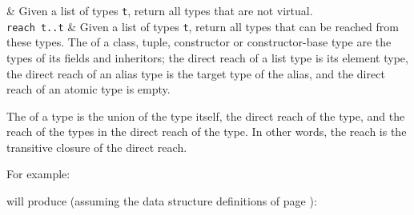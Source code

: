 \begin{desctab}
&
Given a list of types {\tt t}, return all types that are not virtual.
\\
{\tt reach t..t}
&
Given a list of types {\tt t}, return all types that can be reached from
these types. The  of a class, tuple, constructor
or constructor-base type are the types of its fields and inheritors;
the direct reach of a list type is its element type, the direct reach
of an alias type is the target type of the alias, and the direct reach
of an atomic type is empty.
\par
The  of a type is the union of the type itself, the direct
reach of the type, and the reach of the types in the direct reach of
the type.  In other words, the reach is the transitive closure of the
direct reach.
\\
\end{desctab}
For example:
\begin{showfile}

\end{showfile}
will produce (assuming the data structure definitions of page \pageref{plotds}):
\begin{showfile}

\end{showfile}
